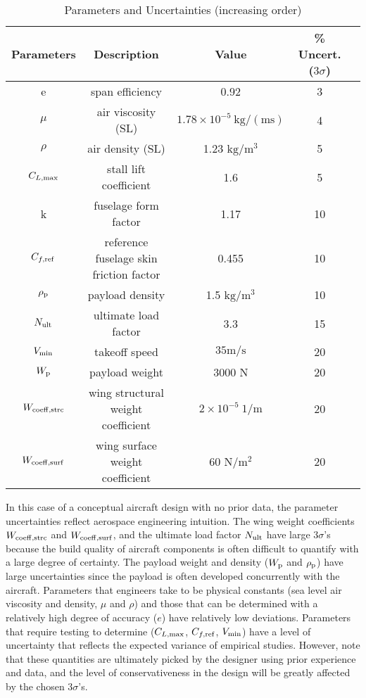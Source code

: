 \begin{table}
\begin{center}
\caption{\label{tab:uncertainties} Parameters and Uncertainties (increasing order)}
\begin{tabular}{c c c c c}
\hline
Parameters & Description & Value & \% Uncert. ($3\sigma$) \\
\hline
e & span efficiency & 0.92 & 3\\
$\mu$ & air viscosity (SL) & $1.78 \times 10^{-5}~\mathrm{kg/(ms)}$ & 4 \\
$\rho$ & air density (SL) & 1.23 $\mathrm{kg/m^3}$ & 5 \\
$C_{L,\rm{max}}$ & stall lift coefficient & 1.6 & 5\\
k & fuselage form factor & 1.17 & 10\\
$C_{f,\rm{ref}}$ & reference fuselage skin friction factor & 0.455 & 10 \\
$\rho_{\rm{p}}$ & payload density & 1.5 $\mathrm{kg/m^3}$ & 10 \\
$N_{\rm{ult}}$ & ultimate load factor & 3.3 & 15\\
$V_{\rm{min}}$ & takeoff speed & $35 \mathrm{m/s}$ & 20\\
$W_{\rm{p}}$ & payload weight & 3000 N & 20\\
$W_{\rm{coeff, strc}}$ & wing structural weight coefficient & $2 \times 10^{-5}~1/\mathrm{m}$ & 20\\
$W_{\rm{coeff,surf}}$ & wing surface weight coefficient & 60 $\mathrm{N/m^2}$ & 20\\
\hline
\end{tabular}
\end{center}
\end{table}

In this case of a conceptual aircraft design with no prior data,
the parameter uncertainties reflect aerospace engineering intuition.
{\color{blue} The wing weight coefficients $W_{\rm{coeff, strc}}$ and $W_{\rm{coeff,surf}}$,
and the ultimate load factor $N_{\rm{ult}}$ have
large $3\sigma$'s because the build quality of aircraft components is
often difficult to quantify with a large degree of certainty.
The payload weight and density ($W_{\rm{p}}$ and $\rho_{\rm{p}}$) have large uncertainties
since the payload is often developed concurrently with the aircraft.
Parameters that engineers take to be
physical constants (sea level air viscosity and density, $\mu$ and $\rho$) and those that can be determined with
a relatively high degree of accuracy ($e$) have relatively low deviations.
Parameters that require testing to determine ($C_{L,\rm{max}}$, $C_{f,\rm{ref}}$,
$V_{\rm{min}}$) have a level of uncertainty
that reflects the expected variance of empirical studies.} However, note that
these quantities are ultimately picked by the designer using prior experience and data,
and the level of conservativeness in the
design will be greatly affected by the chosen $3\sigma$'s.

